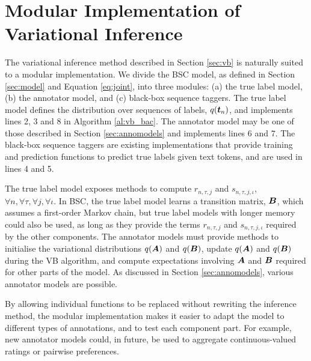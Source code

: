 \section{Modular Implementation of Variational Inference} \label{seq:modular}
 
The variational inference method described in Section  \ref{sec:vb}
is naturally suited to a modular implementation. We divide the BSC model, 
as defined in Section \ref{sec:model} and Equation \ref{eq:joint}, into 
three modules: (a) the true label model, (b) the annotator model, and (c) black-box sequence taggers.
The true label model defines the distribution over sequences of labels, $q(\boldsymbol t_n)$, 
and implements lines 2, 3 and 8 in Algorithm \ref{al:vb_bac}. The annotator model 
may be one of those described in Section \ref{sec:annomodels} and implements lines 6 and 7.
The black-box sequence taggers are existing implementations that provide training and prediction functions
to predict true labels given text tokens, and are used in lines 4 and 5.

The true label model exposes methods to compute 
$r_{n,\tau,j}$ and $s_{n,\tau,j,\iota}$, $\forall n,\forall \tau,\forall j,\forall \iota$.
In BSC, the true label model learns a transition matrix,
$\boldsymbol B$, which assumes a first-order Markov chain, but true label models with longer memory 
could also be used, as long as they provide the terms $r_{n,\tau,j}$ and $s_{n,\tau,j,\iota}$
required by the other components.
The annotator models must provide methods to initialise the variational distributions $q(\boldsymbol A)$ and $q(\boldsymbol B)$,
update $q(\boldsymbol A)$ and $q(\boldsymbol B)$ during the VB algorithm,
and compute expectations involving $\boldsymbol A$ and $\boldsymbol B$ required for other parts of the model.
As discussed in Section \ref{sec:annomodels}, various annotator models are possible.

By allowing individual functions to be replaced without rewriting the inference
method, the modular implementation makes it easier to adapt the model to different types of annotations,
and to test each component part.
For example, new annotator models could, in future, be used to aggregate 
continuous-valued ratings or pairwise preferences.

